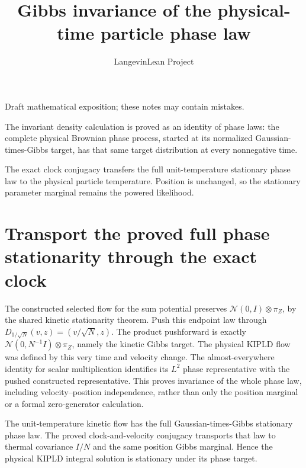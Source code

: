 \documentclass[11pt,a4paper]{article}
\title{\texorpdfstring{Gibbs invariance of the physical-time particle phase law}{Gibbs invariance of the physical-time particle phase law}}
\author{LangevinLean Project}
\date{}
\begin{document}
\maketitle
Draft mathematical exposition; these notes may contain mistakes.


The invariant density calculation is proved as an identity of phase laws: the complete physical Brownian phase process, started at its normalized Gaussian-times-Gibbs target, has that same target distribution at every nonnegative time.



The exact clock conjugacy transfers the full unit-temperature stationary phase law to the physical particle temperature. Position is unchanged, so the stationary parameter marginal remains the powered likelihood.


\section{\texorpdfstring{Transport the proved full phase stationarity through the exact clock}{Transport the proved full phase stationarity through the exact clock}}


The constructed selected flow for the sum potential preserves \(\mathcal N(0,I)\otimes\pi_Z\), by the shared kinetic stationarity theorem. Push this endpoint law through \(D_{1/\sqrt N}(v,z)=(v/\sqrt N,z)\). The product pushforward is exactly \(\mathcal N(0,N^{-1}I)\otimes\pi_Z\), namely the kinetic Gibbs target. The physical KIPLD flow was defined by this very time and velocity change. The almost-everywhere identity for scalar multiplication identifies its \(L^{2}\) phase representative with the pushed constructed representative. This proves invariance of the whole phase law, including velocity–position independence, rather than only the position marginal or a formal zero-generator calculation.



The unit-temperature kinetic flow has the full Gaussian-times-Gibbs stationary phase law. The proved clock-and-velocity conjugacy transports that law to thermal covariance \(I/N\) and the same position Gibbs marginal. Hence the physical KIPLD integral solution is stationary under its phase target.
\end{document}
